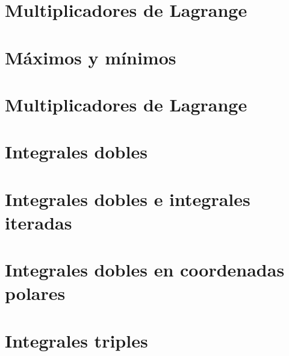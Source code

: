 \documentclass[openany]{book}
\begin{document}
\chapter{Multiplicadores de Lagrange} %


\chapter{Máximos y mínimos} %

\chapter{Multiplicadores de Lagrange}

\chapter{Integrales dobles} %


\chapter{Integrales dobles e integrales iteradas} %


\chapter{Integrales dobles en coordenadas polares}


\chapter{Integrales triples}


\end{document}
